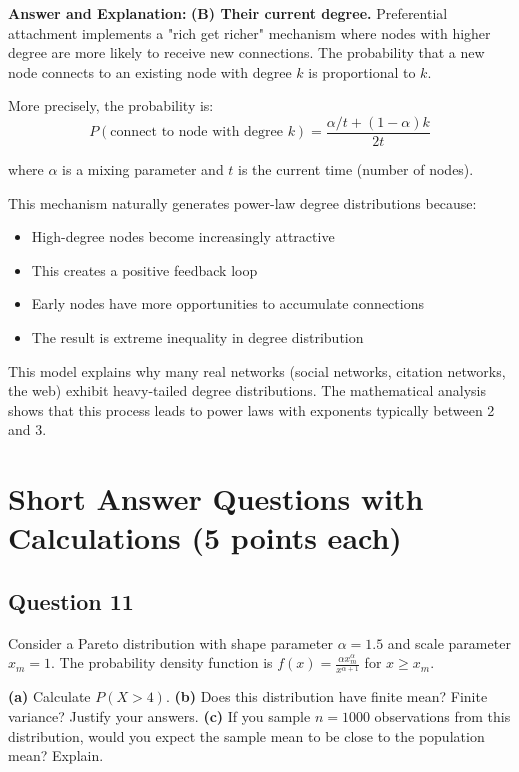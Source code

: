 \documentclass[11pt]{article}
\newenvironment{answer}{\color{answercolor}\begin{framed}\textbf{Answer and Explanation:}}{\end{framed}}
\begin{document}
\begin{answer}
\textbf{(B) Their current degree.} Preferential attachment implements a "rich get richer" mechanism where nodes with higher degree are more likely to receive new connections. The probability that a new node connects to an existing node with degree $k$ is proportional to $k$.

More precisely, the probability is:
$$P(\text{connect to node with degree } k) = \frac{\alpha/t + (1-\alpha)k}{2t}$$

where $\alpha$ is a mixing parameter and $t$ is the current time (number of nodes).

This mechanism naturally generates power-law degree distributions because:
\begin{itemize}
    \item High-degree nodes become increasingly attractive
    \item This creates a positive feedback loop
    \item Early nodes have more opportunities to accumulate connections
    \item The result is extreme inequality in degree distribution
\end{itemize}

This model explains why many real networks (social networks, citation networks, the web) exhibit heavy-tailed degree distributions. The mathematical analysis shows that this process leads to power laws with exponents typically between 2 and 3.
\end{answer}

\section{Short Answer Questions with Calculations (5 points each)}

\subsection{Question 11}
Consider a Pareto distribution with shape parameter $\alpha = 1.5$ and scale parameter $x_m = 1$. The probability density function is $f(x) = \frac{\alpha x_m^\alpha}{x^{\alpha+1}}$ for $x \geq x_m$.

\textbf{(a)} Calculate $P(X > 4)$.
\textbf{(b)} Does this distribution have finite mean? Finite variance? Justify your answers.
\textbf{(c)} If you sample $n = 1000$ observations from this distribution, would you expect the sample mean to be close to the population mean? Explain.
\end{document}
